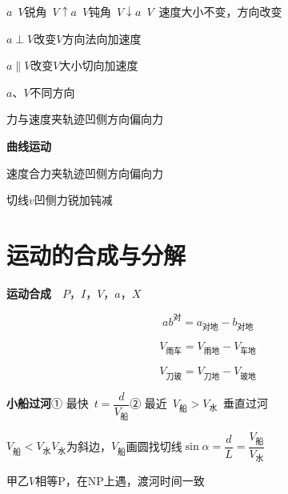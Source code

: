 $a$\ $V$锐角\ $V\uparrow$\qquad $a$\ $V$钝角\ $V\downarrow$\qquad $a$\ $V$\ 速度大小不变，方向改变 %

$a\perp V$\quad 改变$V$方向\quad 法向加速度

$a\parallel V$\quad 改变$V$大小\quad 切向加速度

$a$、$V$不同方向

力与速度夹轨迹\quad 凹侧方向偏向力

\textbf{曲线运动}

速度合力夹轨迹\quad 凹侧方向偏向力

切线$v$\quad 凹侧力\quad 锐加钝减


\section{运动的合成与分解}
\textbf{运动合成}\ \ {\footnotesize $P$，$I$，$V$，$a$，$X$}

\[ ab^{\text{对}}=a_{\text{对地}}-b_{\text{对地}} \]


\[ V_{\text{雨车}}=V_{\text{雨地}}-V_{\text{车地}} \]


\[ V_{\text{刀玻}}=V_{\text{刀地}}-V_{\text{玻地}} \]

\textbf{小船过河}\quad ① 最快\ $t=\dfrac{d}{V_{\text{船}}}$\quad ② 最近\ $V_{\text{船}}>V_{\text{水}}$\ 垂直过河

$V_{\text{船}}<V_{\text{水}}$\quad $V_{\text{水}}$为斜边，$V_{\text{船}}$画圆找切线\quad $\sin\alpha=\dfrac{d}{L}=\dfrac{V_{\text{船}}}{V_{\text{水}}}$



甲乙$V$相等P，在NP上遇，渡河时间一致

